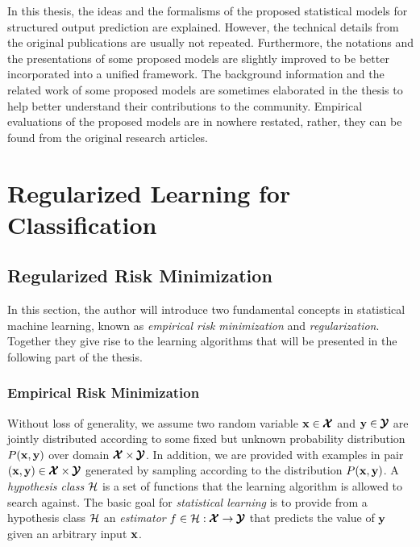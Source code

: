 In this thesis, the ideas and the formalisms of the proposed statistical models for structured output prediction are explained.
However, the technical details from the original publications are usually not repeated.
Furthermore, the notations and the presentations of some proposed models are slightly improved to be better incorporated into a unified framework.
The background information and the related work of some proposed models are sometimes elaborated in the thesis to help better understand their contributions to the community.
Empirical evaluations of the proposed models are in nowhere restated, rather, they can be found from the original research articles. 



%
%
%
\chapter{Regularized Learning for Classification} \label{ch_rlc}



%
\section{Regularized Risk Minimization}\label{sc_rrm}

In this section, the author will introduce two fundamental concepts in statistical machine learning, known as \textit{empirical risk minimization} and \textit{regularization}.
Together they give rise to the learning algorithms that will be presented in the following part of the thesis.

\subsection{Empirical Risk Minimization}\label{sc_erm}

Without loss of generality, we assume two random variable $\mathbf {x}\in\pmb {\mathcal{X}}$ and $\mathbf {y}\in\pmb {\mathcal{Y}}$ are jointly distributed according to some fixed but unknown probability distribution $P(\mathbf {x},\mathbf {y})$ over domain $\pmb {\mathcal{X}}\times\pmb {\mathcal{Y}}$.
In addition, we are provided with examples in pair $(\mathbf {x},\mathbf {y})\in\pmb {\mathcal{X}}\times\pmb {\mathcal{Y}}$ generated by sampling according to the distribution $P(\mathbf {x},\mathbf {y})$.
A \textit{hypothesis class} $\mathcal{H}$ is a set of functions that the learning algorithm is allowed to search against.
The basic goal for \textit{statistical learning} is to provide from a hypothesis class $\mathcal{H}$ an \textit{estimator} $f\in\mathcal{H}:\pmb {\mathcal{X}}\rightarrow\pmb {\mathcal{Y}}$ that predicts the value of $\mathbf {y}$ given an arbitrary input $\mathbf {x}$.

